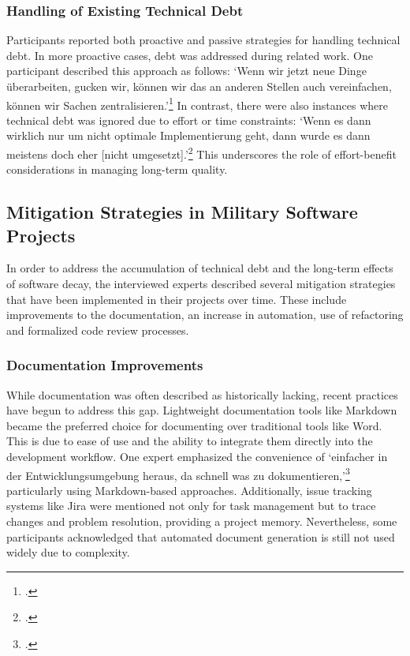 \subsubsection{Handling of Existing Technical Debt}
Participants reported both proactive and passive strategies for handling technical debt. In more proactive cases, debt was addressed during related work. One participant described this approach as follows: `Wenn wir jetzt neue Dinge überarbeiten, gucken wir, können wir das an anderen Stellen auch vereinfachen, können wir Sachen zentralisieren.'\footcite{interview3}
In contrast, there were also instances where technical debt was ignored due to effort or time constraints: `Wenn es dann wirklich nur um nicht optimale Implementierung geht, dann wurde es dann meistens doch eher [nicht umgesetzt].'\footcite{interview2}
This underscores the role of effort-benefit considerations in managing long-term quality.\\

\subsection{Mitigation Strategies in Military Software Projects}
In order to address the accumulation of technical debt and the long-term effects of software decay, the interviewed experts described several mitigation strategies that have been implemented in their projects over time. These include improvements to the documentation, an increase in automation,
use of refactoring and formalized code review processes.

\subsubsection{Documentation Improvements}
While documentation was often described as historically lacking, recent practices have begun to address this gap. Lightweight documentation tools like Markdown became the preferred choice for documenting over traditional tools like Word. This is due to ease of use and the ability to integrate 
them directly into the development workflow. One expert emphasized the convenience of `einfacher in der Entwicklungsumgebung heraus, da schnell was zu dokumentieren,'\footcite{interview3} particularly using Markdown-based approaches. Additionally, issue tracking systems like Jira were mentioned not only for task management
but to trace changes and problem resolution, providing a project memory. Nevertheless, some participants acknowledged that automated document generation is still not used widely due to complexity.\\

